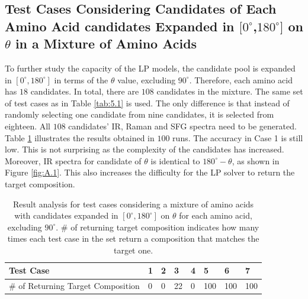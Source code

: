 \subsection{Test Cases Considering Candidates of Each Amino Acid candidates Expanded in $[0^{\circ}$,$180^{\circ}]$ on $\theta$ in a Mixture of Amino Acids}
To further study the capacity of the LP models, the candidate pool is expanded in $[0^{\circ}, 180^{\circ}]$ in terms of the $\theta$ value, excluding $90^{\circ}$. Therefore, each amino acid has $18$ candidates. In total, there are $108$ candidates in the mixture. The same set of test cases as in Table \ref{tab:5.1} is used. The only difference is that instead of randomly selecting one candidate from nine candidates, it is selected from eighteen. All $108$ candidates' IR, Raman and SFG spectra need to be generated. Table \ref{tab:5.3} illustrates the results obtained in $100$ runs. The accuracy in Case 1 is still low. This is not surprising as the complexity of the candidates has increased. Moreover, IR spectra for candidate of $\theta$ is identical to $180^{\circ}-\theta$, as shown in Figure \ref{fig:A.1}. This also increases the difficulty for the LP solver to return the target composition. \\


\begin{table}[ht!]
\begin{center}
{\def\arraystretch{1.5}
\begin{tabular}{| l | l | l | l | l | l | l | l |}
\hline
Test Case & 1 & 2 & 3 & 4 & 5 & 6 & 7 \\ \hline
\# of Returning Target Composition& 0 & 0 & 22 & 0 & 100 & 100 & 100 \\ \hline
\end{tabular} 
}
\end{center}
\caption{Result analysis for test cases considering a mixture of amino acids with candidates expanded in $[0^{\circ}, 180^{\circ}]$ on $\theta$ for each amino acid, excluding $90^{\circ}$. \# of returning target composition indicates how many times each test case in the set return a composition that matches the target one.}
\label{tab:5.3}
\end{table}	

